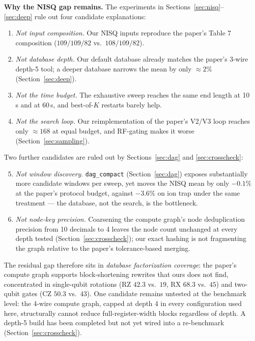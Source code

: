 \documentclass[11pt,a4paper]{article}
\begin{document}
\noindent\textbf{Why the NISQ gap remains.} The experiments in
Sections~\ref{sec:nisq}--\ref{sec:deep} rule out four candidate explanations:
\begin{enumerate}
    \item \emph{Not input composition.} Our NISQ inputs reproduce the paper's
          Table 7 composition ($109/109/82$ vs.\ $108/109/82$).
    \item \emph{Not database depth.} Our default database already matches the
          paper's 3-wire depth-5 tool; a deeper database narrows the mean by
          only $\approx 2\%$ (Section~\ref{sec:deep}).
    \item \emph{Not the time budget.} The exhaustive sweep reaches the same
          end length at 10\,s and at 60\,s, and best-of-$K$ restarts barely
          help.
    \item \emph{Not the search loop.} Our reimplementation of the paper's
          V2/V3 loop reaches only $\approx 168$ at equal budget, and RF-gating
          makes it worse (Section~\ref{sec:sampling}).
\end{enumerate}
Two further candidates are ruled out by Sections~\ref{sec:dag} and
\ref{sec:crosscheck}:
\begin{enumerate}
    \setcounter{enumi}{4}
    \item \emph{Not window discovery.} \texttt{dag\_compact}
          (Section~\ref{sec:dag}) exposes substantially more candidate windows
          per sweep, yet moves the NISQ mean by only $-0.1\%$ at the paper's
          protocol budget, against $-3.6\%$ on ion trap under the same
          treatment --- the database, not the search, is the bottleneck.
    \item \emph{Not node-key precision.} Coarsening the compute graph's node
          deduplication precision from 10 decimals to 4 leaves the node count
          unchanged at every depth tested (Section~\ref{sec:crosscheck}); our
          exact hashing is not fragmenting the graph relative to the paper's
          tolerance-based merging.
\end{enumerate}
The residual gap therefore sits in \emph{database factorization coverage}: the
paper's compute graph supports block-shortening rewrites that ours does not
find, concentrated in single-qubit rotations (RZ $42.3$ vs.\ $19$, RX $68.3$
vs.\ $45$) and two-qubit gates (CZ $50.3$ vs.\ $43$). One candidate remains
untested at the benchmark level: the 4-wire compute graph, capped at depth
4 in every configuration used here, structurally cannot reduce
full-register-width blocks regardless of depth. A depth-5 build has been
completed but not yet wired into a re-benchmark
(Section~\ref{sec:crosscheck}).
\end{document}
